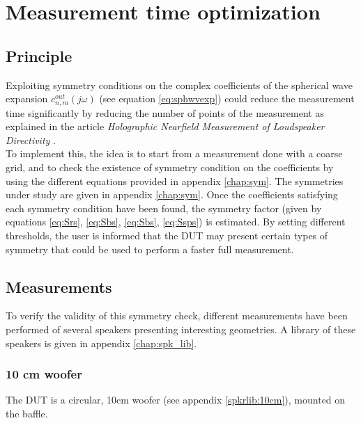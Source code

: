 \documentclass{report}
\begin{document}

\chapter{Measurement time optimization}

\section{Principle}

Exploiting symmetry conditions on the complex coefficients of the spherical wave expansion $c_{n,m}^{out}(j \omega)$ (see equation \ref{eq:sphwvexp}) could reduce the measurement time significantly by reducing the number of points of the measurement as explained in the article \textit{Holographic Nearfield Measurement of Loudspeaker Directivity} \citep[][sect.~4]{aeshs}. \\

To implement this, the idea is to start from a measurement done with a coarse grid, and to check the existence of symmetry condition on the coefficients by using the different equations provided in appendix \ref{chap:sym}. The symmetries under study are given in appendix \ref{chap:sym}.
Once the coefficients satisfying each symmetry condition have been found, the symmetry factor (given by equations \ref{eq:Srs}, \ref{eq:Sbs}, \ref{eq:Sbs}, \ref{eq:Ssps}) is estimated. By setting different thresholds, the user is informed that the DUT may present certain types of symmetry that could be used to perform a faster full measurement.

\section{Measurements}

To verify the validity of this symmetry check, different measurements have been performed of several speakers presenting interesting geometries. A library of these speakers is given in appendix \ref{chap:spk_lib}. 

\subsection{10 cm woofer}

The DUT is a circular, 10cm woofer (see appendix \ref{spkrlib:10cm}), mounted on the baffle. \\
\end{document}
